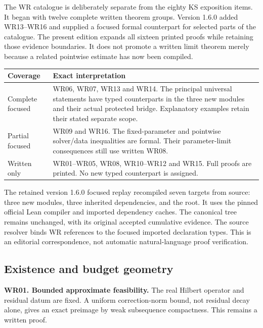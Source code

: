 \clearpage
{}\label{app:written}
The WR catalogue is deliberately separate from the eighty KS exposition items. It began with twelve complete written theorem groups. Version 1.6.0 added WR13--WR16 and supplied a focused formal counterpart for selected parts of the catalogue. The present edition expands all sixteen printed proofs while retaining those evidence boundaries. It does not promote a written limit theorem merely because a related pointwise estimate has now been compiled.

\begin{center}
\begin{tabularx}{\linewidth}{@{}p{.19\linewidth}X@{}}
\toprule Coverage & Exact interpretation\\\midrule
Complete focused & WR06, WR07, WR13 and WR14. The principal universal statements have typed counterparts in the three new modules and their actual protected bridge. Explanatory examples retain their stated separate scope.\\[5pt]
Partial focused & WR09 and WR16. The fixed-parameter and pointwise solver/data inequalities are formal. Their parameter-limit consequences still use written WR08.\\[5pt]
Written only & WR01--WR05, WR08, WR10--WR12 and WR15. Full proofs are printed. No new typed counterpart is assigned.\\\bottomrule
\end{tabularx}
\end{center}

The retained version 1.6.0 focused replay recompiled seven targets from source: three new modules, three inherited dependencies, and the root. It uses the pinned official Lean compiler and imported dependency caches. The canonical  tree remains unchanged, with its original accepted cumulative evidence. The source resolver binds WR references to the focused imported declaration types. This is an editorial correspondence, not automatic natural-language proof verification.

\subsection{Existence and budget geometry}
\textbf{WR01. Bounded approximate feasibility.} The real Hilbert operator and residual datum are fixed. A uniform correction-norm bound, not residual decay alone, gives an exact preimage by weak subsequence compactness. This remains a written proof.

